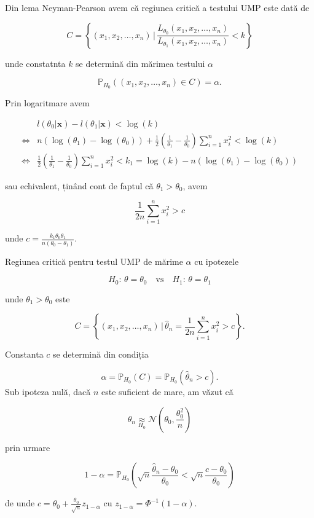 \documentclass[]{article}
\begin{document}
Din lema Neyman-Pearson avem că regiunea critică a testului UMP este
dată de

\[
  C = \left\{(x_1,x_2,\ldots,x_n)\,|\,\frac{L_{\theta_0}(x_1,x_2,\ldots,x_n)}{L_{\theta_1}(x_1,x_2,\ldots,x_n)}<k\right\}
\]

unde constatnta \(k\) se determină din mărimea testului \(\alpha\)

\[
  \mathbb{P}_{H_0}((x_1,x_2,\ldots,x_n)\in C) = \alpha.
\]

Prin logaritmare avem

\begin{align*}
   & l(\theta_0|\mathbf{x}) -  l(\theta_1|\mathbf{x}) < \log(k)\\
   \iff & n\left(\log(\theta_1) - \log(\theta_0)\right) + \frac{1}{2}\left(\frac{1}{\theta_1} - \frac{1}{\theta_0}\right)\sum_{i = 1}^{n}x_i^2 < \log(k)\\
   \iff & \frac{1}{2}\left(\frac{1}{\theta_1} - \frac{1}{\theta_0}\right)\sum_{i = 1}^{n}x_i^2 < k_1 = \log(k) - n\left(\log(\theta_1) - \log(\theta_0)\right)
\end{align*}

sau echivalent, ținând cont de faptul că \(\theta_1>\theta_0\), avem

\[
  \frac{1}{2n}\sum_{i = 1}^{n}x_i^2 > c
\]

unde \(c = \frac{k_1 \theta_0 \theta_1}{n(\theta_0 - \theta_1)}\).

Regiunea critică pentru testul UMP de mărime \(\alpha\) cu ipotezele

\[
  H_0:\, \theta = \theta_0 \quad \text{vs}\quad H_1:\, \theta = \theta_1
\]

unde \(\theta_1>\theta_0\) este

\[
  C = \left\{(x_1,x_2,\ldots,x_n)\,|\,\hat{\theta}_n = \frac{1}{2n}\sum_{i = 1}^{n}x_i^2 > c\right\}.
\]

Constanta \(c\) se determină din condiția

\[
  \alpha = \mathbb{P}_{H_0}(C) = \mathbb{P}_{H_0}(\hat{\theta}_n > c).
\] Sub ipoteza nulă, dacă \(n\) este suficient de mare, am văzut că

\[
  \hat{\theta}_n \underset{H_0}{\approx} \mathcal{N}\left(\theta_0, \frac{\theta_0^2}{n}\right)
\]

prin urmare

\[
  1-\alpha = \mathbb{P}_{H_0}\left(\sqrt{n}\frac{\hat{\theta}_n - \theta_0}{\theta_0}<\sqrt{n}\frac{c - \theta_0}{\theta_0}\right)
\]

de unde \(c = \theta_0 + \frac{\theta_0}{\sqrt{n}}z_{1-\alpha}\) cu
\(z_{1-\alpha} = \Phi^{-1}(1-\alpha)\).
\end{document}
